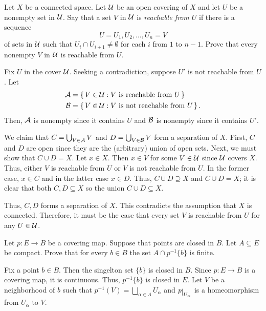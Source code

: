 \begin{problem}
  Let \(X\) be a connected space. Let \(\mathcal{U}\) be an open covering of
  \(X\) and let \(U\) be a nonempty set in \(\mathcal{U}\). Say that a set \(V\)
  in \(\mathcal{U}\) is \emph{reachable from \(U\)} if there is a sequence
  \[
    U=U_1,U_2,\dotsc,U_n=V
  \]
  of sets in \(\mathcal{U}\) such that \(U_i\cap U_{i+1}\neq\emptyset\) for each
  \(i\) from \(1\) to \(n-1\). Prove that every nonempty \(V\) in \(\mathcal{U}\)
  is reachable from \(U\).
\end{problem}
\begin{solution}
  Fix \(U\) in the cover \(\mathcal{U}\). Seeking a contradiction, suppose \(U'\)
  is not reachable from \(U\). Let
  \begin{align*}
    \mathcal{A}&=\left\{\,V\in\mathcal{U}:\text{\(V\) is reachable from
           \(U\)}\,\right\}\\
    \mathcal{B}&=\left\{\,V\in\mathcal{U}:\text{\(V\) is not reachable from
    \(U\)}\,\right\}.
  \end{align*}
  Then, \(\mathcal{A}\) is nonempty since it contains \(U\) and \(\mathcal{B}\) is
  nonempty since it contains \(U'\).

  We claim that \(C=\bigcup_{V\in\mathcal{A}}V\) and \(D=\bigcup_{V\in\mathcal{B}}V\)
  form a separation of \(X\). First, \(C\) and \(D\) are open since they
  are the (arbitrary) union of open sets. Next, we must show that
  \(C\cup D=X\). Let \(x\in X\). Then \(x\in V\) for some \(V\in\mathcal{U}\)
  since \(\mathcal{U}\) covers \(X\). Thus, either \(V\) is reachable from \(U\)
  or \(V\) is not reachable from \(U\). In the former case, \(x\in C\) and
  in the latter case \(x\in D\). Thus, \(C\cup D\supseteq X\) and
  \(C\cup D=X\); it is clear that both \(C,D\subseteq X\) so the union
  \(C\cup D\subseteq X\).

  Thus, \(C,D\) forms a separation of \(X\). This contradicts the
  assumption that \(X\) is connected. Therefore, it must be the case that
  every set \(V\) is reachable from \(U\) for any \(U\in\mathcal{U}\).
\end{solution}

\begin{problem}
  Let \(p\colon E\to B\) be a covering map. Suppose that points are closed
  in \(B\). Let \(A\subseteq E\) be compact. Prove that for every
  \(b\in B\) the set \(A\cap p^{-1}\{b\}\) is finite.
\end{problem}
\begin{solution}
  Fix a point \(b\in B\). Then the singelton set \(\{b\}\) is closed in
  \(B\). Since \(p\colon E\to B\) is a covering map, it is
  continuous. Thus, \(p^{-1}\{b\}\) is closed in \(E\). Let \(V\) be a
  neighborhood of \(b\) such that \(p^{-1}(V)=\bigsqcup_{\alpha\in
    A}U_\alpha\) and \(p\restrict{U_\alpha}\) is a homeomorphism from
  \(U_\alpha\) to \(V\).
\end{solution}


